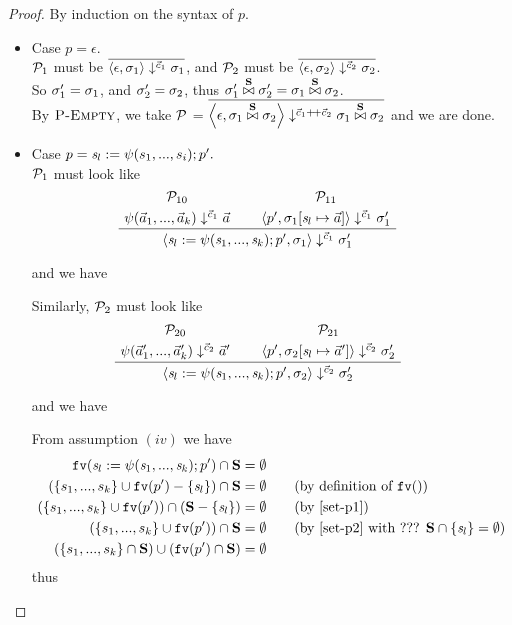 \begin{proof}
	By induction on the syntax of $p$.
\def\sgmx{\sgm_1 \x{\S} \sgm_2}
\def\sgmpx{\sgm_1' \x{\S} \sgm_2'}
\def\cc{\c_1 {\++} \c_2}

 
	\begin{itemize}
	\item Case $p = \epsilon$. \\
	$\mathcal{P}_1$ must be $\overline{\left\langle\epsilon,\sigma_1 \right\rangle \downarrow^{\vec c_1} \sigma_1}$, and
	$\mathcal{P}_2$ must be $\overline{\left\langle\epsilon,\sigma_2 \right\rangle \downarrow^{\vec c_2} \sigma_2}$. \\
	So $\sigma_1' = \sigma_1$, and $\sigma_2' = \sigma_2$, thus $\sigma_1' \stackrel{\mathbf{S}}{\bowtie} \sigma_2' = \sigma_1 \stackrel{\mathbf{S}}{\bowtie} \sigma_2$. \\
	
	By $\textsc{P-Empty}$, we take $\mathcal{P}$ = $\overline{\seval{\epsilon}{\sgmx}{\c_1 {\++} \c_2}{\sgmx}}$ and we are done. 
	
\item Case $p = \mathit{s}_l := \psi(s_1,...,s_i); p'.$ \\
\def\casetwo{\sdef{\s_l}{\lcall\Tupk\s};p'}	
\def\eqnumtwo#1{eq-lem24-c2-{#1}}
	$\mathcal{P}_1$ must look like 
	$$\PT{\UCN{\MP_{10}}{\sevalf{\a_1}{\a_k}{\c_1}{\a}}
		  \UCN{\MP_{11}}{\seval{p'}{\sgm_1[\s_l \|-> \a]}{\c_1}{\sgm_1'}}
			\BC{\seval{\sdef{\s_l}{\lcall\Tupk\s};p'}{\sgm_1}{\c_1}{\sgm_1'}}
	} $$

	and we have 
	
	
    Similarly, $\mathcal{P}_2$ must look like 
	$$\PT{\UCN{\MP_{20}}{\sevalf{\a_1'}{\a_k'}{\c_2}{\a'}}
		\UCN{\MP_{21}}{\seval{p'}{\sgm_2[\s_l \|-> \a']}{\c_2}{\sgm_2'}}
		\BC{\seval{\sdef{\s_l}{\lcall\Tupk\s};p'}{\sgm_2}{\c_2}{\sgm_2'}}
	} $$
	
	and we have
	
	From assumption $(iv)$ we have
	\begin{align*}
		\FV{\casetwo} \cap \S & = \emptyset \\
		(\{s_1,...,s_k\} \cup \FV{p'} - \{\s_l\}) \cap \S & = \emptyset \tag{by definition of $\FV{}$} \\
		(\{s_1,...,s_k\} \cup \FV{p'}) \cap (\S-\{\s_l\}) & = \emptyset \tag{by \eqref{set-p1}} \\
		(\{s_1,...,s_k\} \cup \FV{p'}) \cap \S & = \emptyset \tag{by \eqref{set-p2} with ??? $\S \cap \{\s_l\} = \emptyset$} \\
		(\{s_1,...,s_k\} \cap \S) \cup (\FV{p'} \cap \S ) & = \emptyset 
	\end{align*}
    thus 
    

\end{itemize}
\end{proof}

